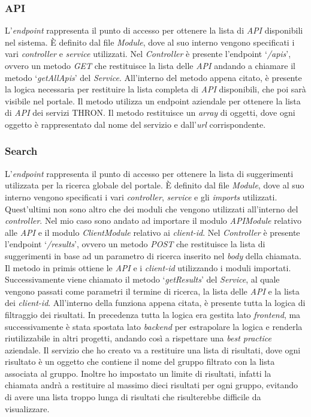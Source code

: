 \subsubsection{API}
L'\textit{endpoint} rappresenta il punto di accesso per ottenere la lista di \textit{API} disponibili nel sistema.
È definito dal file \textit{Module}, dove al suo interno vengono specificati i vari \textit{controller} e \textit{service} utilizzati.
Nel \textit{Controller} è presente l'endpoint `\textit{/apis}', ovvero un metodo \textit{GET} che restituisce la lista delle \textit{API} andando
a chiamare il metodo `\textit{getAllApis}' del \textit{Service}.
All'interno del metodo appena citato, è presente la logica necessaria per restituire la lista completa di \textit{API} disponibili, che poi sarà visibile nel portale.
Il metodo utilizza un endpoint aziendale per ottenere la lista di \textit{API} dei servizi THRON.
Il metodo restituisce un \textit{array} di oggetti, dove ogni oggetto è rappresentato dal nome del servizio e dall'\textit{url} corrispondente.

\subsubsection{Search}
L'\textit{endpoint} rappresenta il punto di accesso per ottenere la lista di suggerimenti utilizzata per la ricerca globale del portale.
È definito dal file \textit{Module}, dove al suo interno vengono specificati i vari \textit{controller}, \textit{service} e gli \textit{imports} utilizzati. 
Quest'ultimi non sono altro che dei moduli che vengono utilizzati all'interno del \textit{controller}. Nel mio caso sono andato ad importare il modulo \textit{APIModule}
relativo alle \textit{API} e il modulo \textit{ClientModule} relativo ai \textit{client-id}.
Nel \textit{Controller} è presente l'endpoint `\textit{/results}', ovvero un metodo \textit{POST} che restituisce la lista di suggerimenti in base ad un parametro di ricerca
inserito nel \textit{body} della chiamata. Il metodo in primis ottiene le \textit{API} e i \textit{client-id} utilizzando i moduli importati. 
Successivamente viene chiamato il metodo `\textit{getResults}' del \textit{Service}, al quale vengono passati come parametri il termine di ricerca, la lista delle \textit{API} e la lista dei \textit{client-id}.
All'interno della funziona appena citata, è presente tutta la logica di filtraggio dei risultati. In precedenza tutta la logica era gestita lato \textit{frontend}, ma successivamente 
è stata spostata lato \textit{backend} per estrapolare la logica e renderla riutilizzabile in altri progetti, andando così a rispettare una \textit{best practice} aziendale.
Il servizio che ho creato va a restituire una lista di risultati, dove ogni risultato è un oggetto che contiene il nome del gruppo filtrato con la lista associata al gruppo.
Inoltre ho impostato un limite di risultati, infatti la chiamata andrà a restituire al massimo dieci risultati per ogni gruppo, evitando di avere una lista troppo lunga di risultati che risulterebbe difficile 
da visualizzare.
